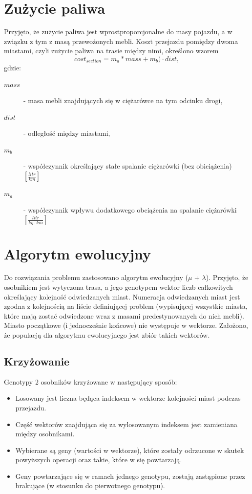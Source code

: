 \documentclass[12pt, oneside, final]{report}
\begin{document}
\section{Zużycie paliwa}
Przyjęto, że zużycie paliwa jest wprostproporcjonalne do masy pojazdu, a w związku z tym z masą przewożonych mebli. Koszt przejazdu pomiędzy dwoma miastami, czyli zużycie paliwa na trasie między nimi, określono wzorem
\begin{equation}
cost_{section} = m_a * mass + m_b) \cdot dist,
\end{equation}
gdzie: 
\begin{description}
\item[$mass$] - masa mebli znajdujących się w ciężarówce na tym odcinku drogi,
\item[$dist$] - odległość między miastami,
\item[$m_b$] - współczynnik określający stałe spalanie ciężarówki (bez obiciążenia) $[\frac{litr}{km}]$
\item[$m_a$] - współczynnik wpływu dodatkowego obciążenia na spalanie ciężarówki $[\frac{litr}{kg \cdot km}]$
\end{description}

\section{Algorytm ewolucyjny}
Do rozwiązania problemu zastosowano algorytm ewolucyjny ($\mu$ + $\lambda$). Przyjęto, że osobnikiem jest wytyczona trasa, a jego genotypem wektor liczb całkowitych określający kolejność odwiedzanych miast. Numeracja odwiedzanych miast jest zgodna z kolejnością na liście definiującej problem (wypisującej wszystkie miasta, które mają zostać odwiedzone wraz z masami predestynowanych do nich mebli). Miasto początkowe (i jednocześnie końcowe) nie występuje w wektorze. Założono, że populacją dla algorytmu ewolucyjnego jest zbiór takich wektorów.

\subsection{Krzyżowanie}
Genotypy 2 osobników krzyżowane w następujący sposób:
\begin{itemize}
\item Losowany jest liczna będąca indeksem w wektorze kolejności miast podczas przejazdu.
\item Część wektorów znajdująca się za wylosowanym indeksem jest zamieniana między osobnikami.
\item Wybierane są geny (wartości w wektorze), które zostały odrzucone w skutek powyższych operacji oraz takie, które w się powtarzają.
\item Geny powtarzające się w ramach jednego genotypu, zostają zastąpione przez brakujące (w stosunku do pierwotnego genotypu).
\end{itemize}
\end{document}
